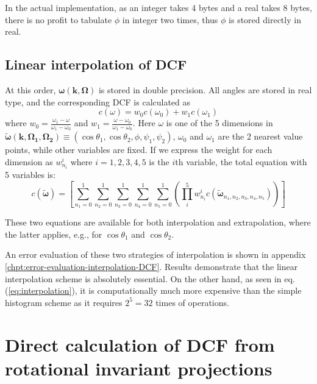 In the actual implementation, as an integer takes 4 bytes and a real
takes 8 bytes, there is no profit to tabulate $\phi$ in integer two
times, thus $\phi$ is stored directly in real.


\subsection{Linear interpolation of DCF\label{sub:Linear-interpolation-of}}

At this order, $\boldsymbol{\omega}(\mathbf{k},\mathbf{\Omega})$
is stored in double precision. All angles are stored in real type,
and the corresponding DCF is calculated as
\begin{equation}
c(\omega)=w_{0}c(\omega_{0})+w_{1}c(\omega_{1})
\end{equation}
where $w_{0}=\frac{\omega_{1}-\omega}{\omega_{1}-\omega_{0}}$ and
$w_{1}=\frac{\omega-\omega_{0}}{\omega_{1}-\omega_{0}}$. Here $\omega$
is one of the 5 dimensions in $\tilde{\boldsymbol{\omega}}(\mathbf{k},\mathbf{\Omega_{1}},\mathbf{\Omega_{2}})\equiv(\cos\theta_{1},\cos\theta_{2},\phi,\psi_{1},\psi_{2})$,
$\omega_{0}$ and $\omega_{1}$ are the 2 nearest value points, while
other variables are fixed. If we express the weight for each dimension
as $w_{n_{i}}^{i}$ where $i=1,2,3,4,5$ is the $i$th variable, the
total equation with 5 variables is:
\begin{equation}
c(\tilde{\boldsymbol{\omega}})=\left[\sum_{n_{1}=0}^{1}\sum_{n_{2}=0}^{1}\sum_{n_{3}=0}^{1}\sum_{n_{4}=0}^{1}\sum_{n_{5}=0}^{1}\left(\prod_{i}^{5}w_{n_{i}}^{i}c(\tilde{\boldsymbol{\omega}}_{n_{1},n_{2},n_{3},n_{4},n_{5}})\right)\right]\label{eq:interpolation}
\end{equation}


These two equations are available for both interpolation and extrapolation,
where the latter applies, e.g., for $\cos\theta_{1}$ and $\cos\theta_{2}$. 

An error evaluation of these two strategies of interpolation is shown
in appendix \ref{chpt:error-evaluation-interpolation-DCF}. Results
demonstrate that the linear interpolation scheme is absolutely essential.
On the other hand, as seen in eq. (\ref{eq:interpolation}), it is
computationally much more expensive than the simple histogram scheme
as it requires $2^{5}=32$ times of operations.


\section{Direct calculation of DCF from rotational invariant projections}

